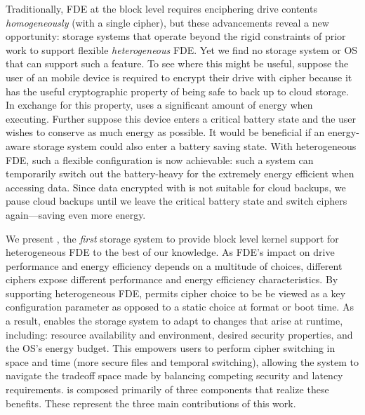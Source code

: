 Traditionally, FDE at the block level requires enciphering drive contents {\em
homogeneously} (with a single cipher), but these advancements reveal a new
opportunity: storage systems that operate beyond the rigid constraints of prior
work to support flexible {\em heterogeneous} FDE. Yet we find no storage system
or OS that can support such a feature. To see where this might be useful,
suppose the user of an mobile device is required to encrypt their drive with
cipher \encA because it has the useful cryptographic property of being safe to
back up to cloud storage. In exchange for this property, \encA uses a
significant amount of energy when executing. Further suppose this device enters
a critical battery state and the user wishes to conserve as much energy as
possible. It would be beneficial if an energy-aware storage system could also
enter a battery saving state. With heterogeneous FDE, such a flexible
configuration is now achievable: such a system can temporarily switch out the
battery-heavy \encA for the extremely energy efficient \encB when accessing
data. Since data encrypted with \encB is not suitable for cloud backups, we
pause cloud backups until we leave the critical battery state and switch ciphers
again---saving even more energy.


We present \sys, the {\em first} storage system to provide block level kernel
support for heterogeneous FDE to the best of our knowledge. As FDE's impact on
drive performance and energy efficiency depends on a multitude of choices,
different ciphers expose different performance and energy efficiency
characteristics. By supporting heterogeneous FDE, \sys permits cipher choice to
be be viewed as a key configuration parameter as opposed to a static choice at
format or boot time. As a result, \sys enables the storage system to adapt to
changes that arise at runtime, including: resource availability and environment,
desired security properties, and the OS's energy budget. This empowers users to
perform cipher switching in space and time (\eg more secure files and temporal
switching), allowing the system to navigate the tradeoff space made by balancing
competing security and latency requirements. \sys is composed primarily of three
components that realize these benefits. These represent the three main
contributions of this work.

